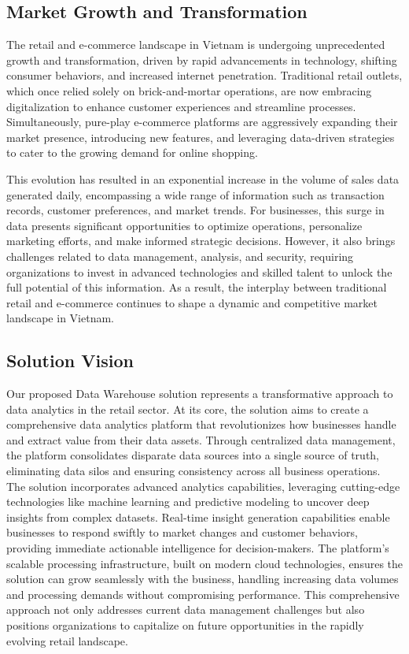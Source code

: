 \subsection{Market Growth and Transformation}
The retail and e-commerce landscape in Vietnam is undergoing unprecedented growth and
transformation, driven by rapid advancements in technology, shifting consumer behaviors, and
increased internet penetration. Traditional retail outlets, which once relied solely on
brick-and-mortar operations, are now embracing digitalization to enhance customer experiences and
streamline processes. Simultaneously, pure-play e-commerce platforms are aggressively expanding
their market presence, introducing new features, and leveraging data-driven strategies to cater to
the growing demand for online shopping.

This evolution has resulted in an exponential increase in the volume of sales data generated daily,
encompassing a wide range of information such as transaction records, customer preferences, and
market trends. For businesses, this surge in data presents significant opportunities to optimize
operations, personalize marketing efforts, and make informed strategic decisions. However, it also
brings challenges related to data management, analysis, and security, requiring organizations to
invest in advanced technologies and skilled talent to unlock the full potential of this information.
As a result, the interplay between traditional retail and e-commerce continues to shape a dynamic
and competitive market landscape in Vietnam.

\subsection{Solution Vision}
Our proposed Data Warehouse solution represents a transformative approach to data analytics in the
retail sector. At its core, the solution aims to create a comprehensive data analytics platform that
revolutionizes how businesses handle and extract value from their data assets. Through centralized
data management, the platform consolidates disparate data sources into a single source of truth,
eliminating data silos and ensuring consistency across all business operations. The solution
incorporates advanced analytics capabilities, leveraging cutting-edge technologies like machine
learning and predictive modeling to uncover deep insights from complex datasets. Real-time insight
generation capabilities enable businesses to respond swiftly to market changes and customer
behaviors, providing immediate actionable intelligence for decision-makers. The platform's scalable
processing infrastructure, built on modern cloud technologies, ensures the solution can grow
seamlessly with the business, handling increasing data volumes and processing demands without
compromising performance. This comprehensive approach not only addresses current data management
challenges but also positions organizations to capitalize on future opportunities in the rapidly
evolving retail landscape.

